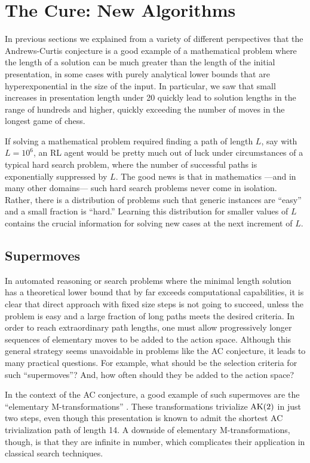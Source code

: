 \section{The Cure: New Algorithms}\label{sec:algo}

In previous sections we explained from a variety of different perspectives that the Andrews-Curtis conjecture is a good example of a mathematical problem where the length of a solution can be much greater than the length of the initial presentation, in some cases with purely analytical lower bounds that are hyperexponential in the size of the input. In particular, we saw that small increases in presentation length under 20 quickly lead to solution lengths in the range of hundreds and higher, quickly exceeding the number of moves in the longest game of chess.

If solving a mathematical problem required finding a path of length $L$, say with $L=10^6$, an RL agent would be pretty much out of luck under circumstances of a typical hard search problem, where the number of successful paths is exponentially suppressed by $L$. The good news is that in mathematics ---and in many other domains--- such hard search problems never come in isolation. Rather, there is a distribution of problems such that generic instances are ``easy'' and a small fraction is ``hard.'' Learning this distribution for smaller values of $L$ contains the crucial information for solving new cases at the next increment of $L$.

\subsection{Supermoves}

In automated reasoning or search problems where the minimal length solution has a theoretical lower bound that by far exceeds computational capabilities, it is clear that direct approach with fixed size steps is not going to succeed, unless the problem is easy and a large fraction of long paths meets the desired criteria. In order to reach extraordinary path lengths, one must allow progressively longer sequences of elementary moves to be added to the action space. Although this general strategy seems unavoidable in problems like the AC conjecture, it leads to many practical questions. For example, what should be the selection criteria for such ``supermoves''? And, how often should they be added to the action space?

In the context of the AC conjecture, a good example of such supermoves are the ``elementary M-transformations'' \cite{BurnsI, BurnsII}. These transformations trivialize $\text{AK}(2)$ in just two steps, even though this presentation is known to admit the shortest AC trivialization path of length 14. A downside of elementary M-transformations, though, is that they are infinite in number, which complicates their application in classical search techniques.


